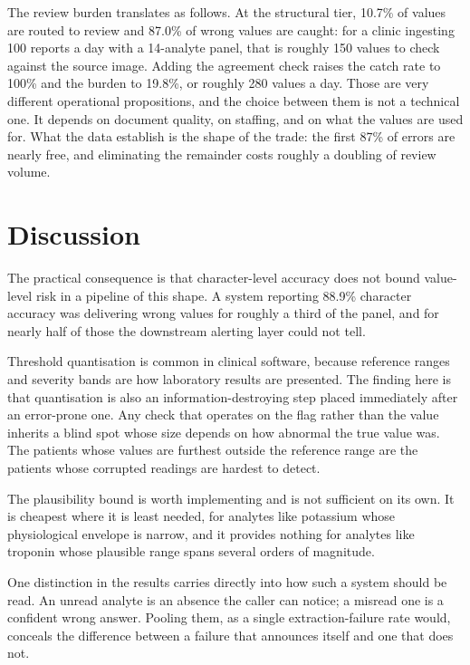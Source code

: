 \documentclass[11pt]{article}
\begin{document}
The review burden translates as follows. At the structural tier, 10.7\% of
values are routed to review and 87.0\% of wrong values are caught: for a clinic ingesting 100
reports a day with a 14-analyte panel, that is roughly 150 values to check against the source
image. Adding the agreement check raises the catch rate to 100\% and the burden to 19.8\%, or
roughly 280 values a day. Those are very different operational propositions, and the choice
between them is not a technical one. It depends on document quality, on staffing, and on what
the values are used for. What the data establish is the shape of the trade: the first 87\% of
errors are nearly free, and eliminating the remainder costs roughly a doubling of review
volume.

\section{Discussion}

The practical consequence is that character-level accuracy does not bound value-level risk in a
pipeline of this shape. A system reporting 88.9\% character accuracy was delivering
wrong values for roughly a third of the panel, and for nearly half of those the downstream
alerting layer could not tell.

Threshold quantisation is common in clinical software, because reference ranges and severity
bands are how laboratory results are presented. The finding here is that quantisation is also an
information-destroying step placed immediately after an error-prone one. Any check that operates
on the flag rather than the value inherits a blind spot whose size depends on how abnormal the
true value was. The patients whose values are furthest outside the reference range are the
patients whose corrupted readings are hardest to detect.

The plausibility bound is worth implementing and is not sufficient on its own. It is cheapest
where it is least needed, for analytes like potassium whose physiological envelope is narrow,
and it provides nothing for analytes like troponin whose plausible range spans several orders of
magnitude.

One distinction in the results carries directly into how such a system should be read. An
unread analyte is an absence the caller can notice; a misread one is a confident wrong answer.
Pooling them, as a single extraction-failure rate would, conceals the difference between a
failure that announces itself and one that does not.
\end{document}
